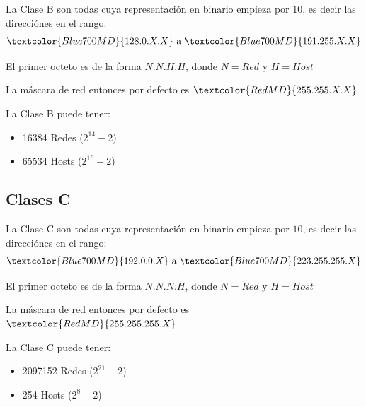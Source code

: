 \documentclass[12pt, fleqn]{report}                             %
\theoremstyle{break}                                            %
\newcommand{\Color}[2]{\textcolor{#1}{#2}}                      %
\begin{document}
                La Clase B son todas cuya representación en binario empieza por $10$, es decir las
                direcciónes en el rango:
                \begin{equation*}
                    \Color{Blue700MD}{128.0.X.X}
                    \text{ a }
                    \Color{Blue700MD}{191.255.X.X}
                \end{equation*}

                El primer octeto es de la forma $N.N.H.H$, donde $N = Red$ y $H = Host$

                La máscara de red entonces por defecto es $\Color{RedMD}{255.255.X.X}$

                La Clase B puede tener:
                \begin{itemize}
                    \item 16384 Redes ($2^{14} - 2$)
                    \item 65534 Hosts ($2^{16} - 2$)
                \end{itemize}


            \clearpage
            \subsection{Clases C}

                La Clase C son todas cuya representación en binario empieza por $10$, es decir las
                direcciónes en el rango:
                \begin{equation*}
                    \Color{Blue700MD}{192.0.0.X}
                    \text{ a }
                    \Color{Blue700MD}{223.255.255.X}
                \end{equation*}

                El primer octeto es de la forma $N.N.N.H$, donde $N = Red$ y $H = Host$

                La máscara de red entonces por defecto es $\Color{RedMD}{255.255.255.X}$

                La Clase C puede tener:
                \begin{itemize}
                    \item 2097152 Redes ($2^{21} - 2$)
                    \item 254 Hosts ($2^{8} - 2$)
                \end{itemize}
\end{document}
